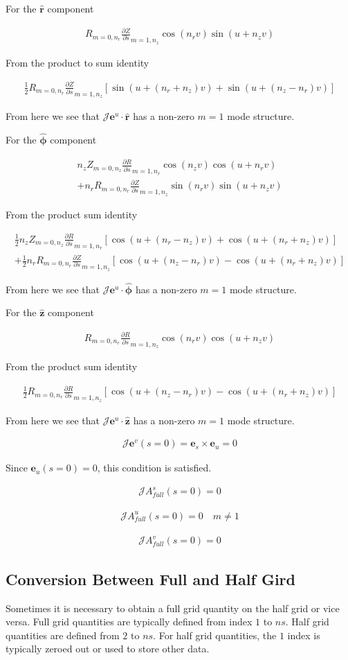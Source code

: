 \documentclass[11pt]{article}
\newcommand{\brackets}[1]{\left(#1\right)}
\newcommand{\sqbrackets}[1]{\left[#1\right]}
\renewcommand{\vec}[1]{\boldsymbol#1}
\newcommand{\unitv}[1]{\hat{\vec{#1}}}
\newcommand{\co}[1]{\vec{e}_{#1}}
\newcommand{\con}[1]{\vec{e}^{#1}}
\newcommand{\pd}[2]{\frac{\partial#1}{\partial#2}}
\newcommand{\equ}[2]{
	\begin{equation}
    \begin{split}
	#1
	\label{#2}
	\end{split}
	\end{equation}
}
\newcommand{\dotp}[2]{#1\cdot#2}
\newcommand{\crossp}[2]{#1\times#2}
\begin{document}
For the $\unitv{r}$ component
\equ{
R_{m=0,n_{r}}\pd{Z}{s}_{m=1,n_{z}}\cos\brackets{n_{r}v}\sin\brackets{u+n_{z}v}
}{equ:rhat_ev_cross_es}
From the product to sum identity
\equ{
\frac{1}{2}R_{m=0,n_{r}}\pd{Z}{s}_{m=1,n_{z}}\sqbrackets{\sin\brackets{u+\brackets{n_{r}+n_{z}}v}+\sin\brackets{u+\brackets{n_{z}-n_{r}}v}}
}{equ:rhat_ev_cross_es_2}
From here we see that $\mathcal{J}\dotp{\con{u}}{\unitv{r}}$ has a non-zero $m=1$ mode structure.

For the $\unitv{\phi}$ component
\equ{
n_{z}Z_{m=0,n_{z}}\pd{R}{s}_{m=1,n_{r}}\cos\brackets{n_{z}v}\cos\brackets{u+n_{r}v}\\
+n_{r}R_{m=0,n_{r}}\pd{Z}{s}_{m=1,n_{z}}\sin\brackets{n_{r}v}\sin\brackets{u+n_{z}v}
}{equ:phihat_ev_cross_es}
From the product sum identity
\equ{
\frac{1}{2}n_{z}Z_{m=0,n_{z}}\pd{R}{s}_{m=1,n_{r}}\sqbrackets{\cos\brackets{u+\brackets{n_{r}-n_{z}}v}+\cos\brackets{u+\brackets{n_{r}+n_{z}}v}}\\
+\frac{1}{2}n_{r}R_{m=0,n_{r}}\pd{Z}{s}_{m=1,n_{z}}\sqbrackets{\cos\brackets{u+\brackets{n_{z}-n_{r}}v}-\cos\brackets{u+\brackets{n_{r}+n_{z}}v}}
}{equ:phihat_ev_cross_es_2}
From here we see that $\mathcal{J}\dotp{\con{u}}{\unitv{\phi}}$ has a non-zero $m=1$ mode structure.

For the $\unitv{z}$ component
\equ{
R_{m=0,n_{r}}\pd{R}{s}_{m=1,n_{z}}\cos\brackets{n_{r}v}\cos\brackets{u+n_{z}v}
}{equ:zhat_ev_cross_es}
From the product sum identity
\equ{
\frac{1}{2}R_{m=0,n_{r}}\pd{R}{s}_{m=1,n_{z}}\sqbrackets{\cos\brackets{u+\brackets{n_{z}-n_{r}}v}-\cos\brackets{u+\brackets{n_{r}+n_{z}}v}}
}{equ:zhat_ev_cross_es_2}
From here we see that $\mathcal{J}\dotp{\con{u}}{\unitv{z}}$ has a non-zero $m=1$ mode structure.

\equ{
\mathcal{J}\con{v}\brackets{s=0}=\crossp{\co{s}}{\co{u}}=0
}{equ:covtravariant_boundary_v}
Since $\co{u}\brackets{s=0}=0$, this condition is satisfied.

\equ{
\mathcal{J}A_{full}^{s}\brackets{s=0}=0
}{equ:covariant_boundary_s}
\equ{
\mathcal{J}A_{full}^{u}\brackets{s=0}=0\quad m \ne 1
}{equ:covariant_boundary_u}
\equ{
\mathcal{J}A_{full}^{v}\brackets{s=0}=0
}{equ:covariant_boundary_v}

\subsection{Conversion Between Full and Half Gird}
Sometimes it is necessary to obtain a full grid quantity on the half grid or vice versa.
Full grid quantities are typically defined from index $1$ to $ns$.
Half grid quantities are defined from $2$ to $ns$.
For half grid quantities, the $1$ index is typically zeroed out or used to store other data.
\end{document}
